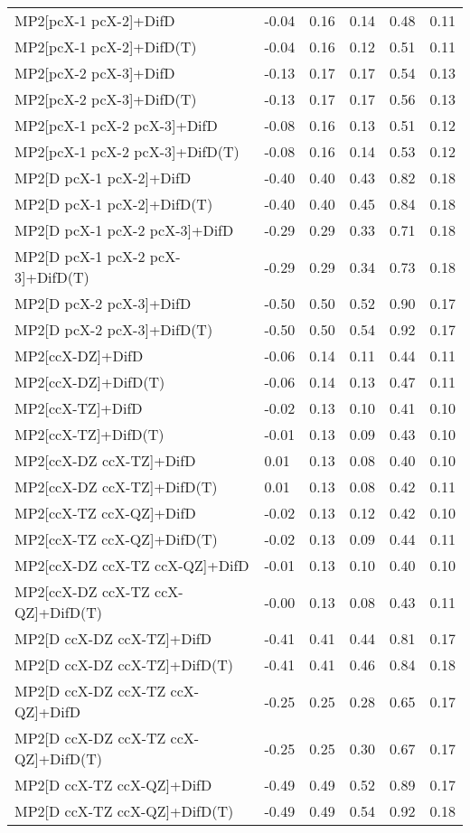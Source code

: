 \begin{table}
\begin{tabular}{l l l l l l }
    MP2[pcX-1 pcX-2]+DifD & -0.04 & 0.16 & 0.14 & 0.48 & 0.11 \\ 
    MP2[pcX-1 pcX-2]+DifD(T) & -0.04 & 0.16 & 0.12 & 0.51 & 0.11 \\ 
    MP2[pcX-2 pcX-3]+DifD & -0.13 & 0.17 & 0.17 & 0.54 & 0.13 \\ 
    MP2[pcX-2 pcX-3]+DifD(T) & -0.13 & 0.17 & 0.17 & 0.56 & 0.13 \\ 
    MP2[pcX-1 pcX-2 pcX-3]+DifD & -0.08 & 0.16 & 0.13 & 0.51 & 0.12 \\ 
    MP2[pcX-1 pcX-2 pcX-3]+DifD(T) & -0.08 & 0.16 & 0.14 & 0.53 & 0.12 \\ 
    MP2[D pcX-1 pcX-2]+DifD & -0.40 & 0.40 & 0.43 & 0.82 & 0.18 \\ 
    MP2[D pcX-1 pcX-2]+DifD(T) & -0.40 & 0.40 & 0.45 & 0.84 & 0.18 \\ 
    MP2[D pcX-1 pcX-2 pcX-3]+DifD & -0.29 & 0.29 & 0.33 & 0.71 & 0.18 \\ 
    MP2[D pcX-1 pcX-2 pcX-3]+DifD(T) & -0.29 & 0.29 & 0.34 & 0.73 & 0.18 \\ 
    MP2[D pcX-2 pcX-3]+DifD & -0.50 & 0.50 & 0.52 & 0.90 & 0.17 \\ 
    MP2[D pcX-2 pcX-3]+DifD(T) & -0.50 & 0.50 & 0.54 & 0.92 & 0.17 \\ 
    MP2[ccX-DZ]+DifD & -0.06 & 0.14 & 0.11 & 0.44 & 0.11 \\ 
    MP2[ccX-DZ]+DifD(T) & -0.06 & 0.14 & 0.13 & 0.47 & 0.11 \\ 
    MP2[ccX-TZ]+DifD & -0.02 & 0.13 & 0.10 & 0.41 & 0.10 \\ 
    MP2[ccX-TZ]+DifD(T) & -0.01 & 0.13 & 0.09 & 0.43 & 0.10 \\ 
    MP2[ccX-DZ ccX-TZ]+DifD & 0.01 & 0.13 & 0.08 & 0.40 & 0.10 \\ 
    MP2[ccX-DZ ccX-TZ]+DifD(T) & 0.01 & 0.13 & 0.08 & 0.42 & 0.11 \\ 
    MP2[ccX-TZ ccX-QZ]+DifD & -0.02 & 0.13 & 0.12 & 0.42 & 0.10 \\ 
    MP2[ccX-TZ ccX-QZ]+DifD(T) & -0.02 & 0.13 & 0.09 & 0.44 & 0.11 \\ 
    MP2[ccX-DZ ccX-TZ ccX-QZ]+DifD & -0.01 & 0.13 & 0.10 & 0.40 & 0.10 \\ 
    MP2[ccX-DZ ccX-TZ ccX-QZ]+DifD(T) & -0.00 & 0.13 & 0.08 & 0.43 & 0.11 \\ 
    MP2[D ccX-DZ ccX-TZ]+DifD & -0.41 & 0.41 & 0.44 & 0.81 & 0.17 \\ 
    MP2[D ccX-DZ ccX-TZ]+DifD(T) & -0.41 & 0.41 & 0.46 & 0.84 & 0.18 \\ 
    MP2[D ccX-DZ ccX-TZ ccX-QZ]+DifD & -0.25 & 0.25 & 0.28 & 0.65 & 0.17 \\ 
    MP2[D ccX-DZ ccX-TZ ccX-QZ]+DifD(T) & -0.25 & 0.25 & 0.30 & 0.67 & 0.17 \\ 
    MP2[D ccX-TZ ccX-QZ]+DifD & -0.49 & 0.49 & 0.52 & 0.89 & 0.17 \\ 
    MP2[D ccX-TZ ccX-QZ]+DifD(T) & -0.49 & 0.49 & 0.54 & 0.92 & 0.18 \\ 
    \bottomrule
  \end{tabular}
\end{table}
